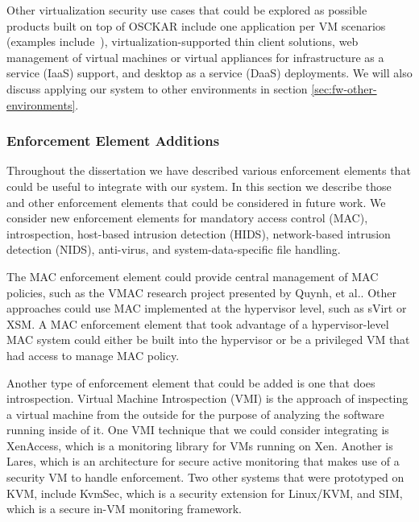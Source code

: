 Other virtualization security use cases that could be explored as possible products built on top of OSCKAR include one application per VM scenarios (examples include~\cite{apiary_usenix_2010,virtics_2010,qubes-os_2010}), virtualization-supported thin client solutions, web management of virtual machines or virtual appliances for infrastructure as a service (IaaS) support, and desktop as a service (DaaS) deployments. We will also discuss applying our system to other environments in section \ref{sec:fw-other-environments}. 

\subsubsection{Enforcement Element Additions}

Throughout the dissertation we have described various enforcement elements that could be useful to integrate with our system. In this section we describe those and other enforcement elements that could be considered in future work. We consider new enforcement elements for mandatory access control (MAC), introspection, host-based intrusion detection (HIDS), network-based intrusion detection (NIDS), anti-virus, and system-data-specific file handling.

The MAC enforcement element could provide central management of MAC policies, such as the VMAC research project presented by Quynh, et al.\cite{Quynh_2006}. Other approaches could use MAC implemented at the hypervisor level, such as sVirt\cite{sVirt_website} or XSM\cite{xsm_xen_summit_3rd,xsm_xen_summit_4th}. A MAC enforcement element that took advantage of a hypervisor-level MAC system could either be built into the hypervisor or be a privileged VM that had access to manage MAC policy.

Another type of enforcement element that could be added is one that does introspection. Virtual Machine Introspection (VMI) is the approach of inspecting a virtual machine from the outside for the purpose of analyzing the software running inside of it\cite{VMI_IDS_2003}. One VMI technique that we could consider integrating is XenAccess\cite{xenaccess_07}, which is a monitoring library for VMs running on Xen. Another is Lares\cite{payne_lares_2008}, which is an architecture for secure active monitoring that makes use of a security VM to handle enforcement. Two other systems that were prototyped on KVM, include KvmSec\cite{lombardi_2009}, which is a security extension for Linux/KVM, and SIM\cite{sharif_2009}, which is a secure in-VM monitoring framework.
 
